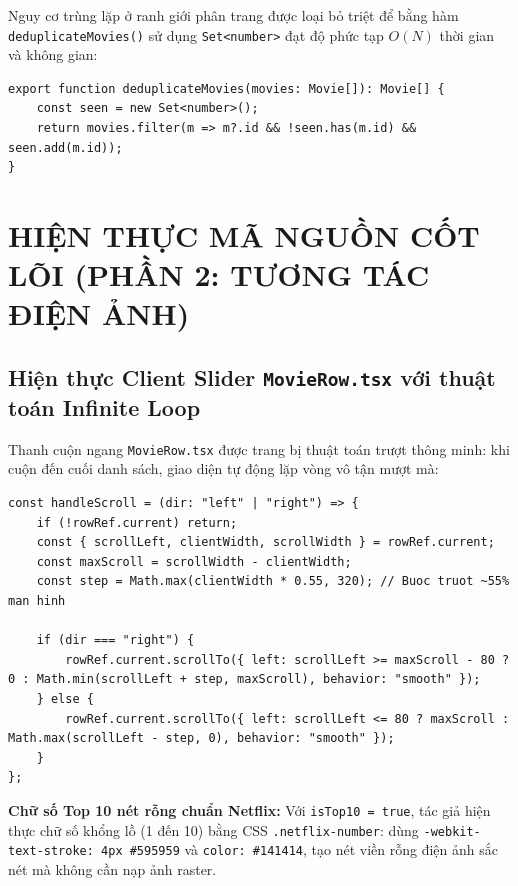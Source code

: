 \documentclass[12pt,a4paper]{extarticle}
\begin{document}
\noindent Nguy cơ trùng lặp ở ranh giới phân trang được loại bỏ triệt để bằng hàm \texttt{deduplicateMovies()} sử dụng \texttt{Set<number>} đạt độ phức tạp $O(N)$ thời gian và không gian:

\begin{lstlisting}[caption={Thuật toán loại bỏ phần tử trùng lặp theo ID}]
export function deduplicateMovies(movies: Movie[]): Movie[] {
    const seen = new Set<number>();
    return movies.filter(m => m?.id && !seen.has(m.id) && seen.add(m.id));
}
\end{lstlisting}

\section{HIỆN THỰC MÃ NGUỒN CỐT LÕI (PHẦN 2: TƯƠNG TÁC ĐIỆN ẢNH)}

\subsection{Hiện thực Client Slider \texttt{MovieRow.tsx} với thuật toán Infinite Loop}
Thanh cuộn ngang \texttt{MovieRow.tsx} được trang bị thuật toán trượt thông minh: khi cuộn đến cuối danh sách, giao diện tự động lặp vòng vô tận mượt mà:

\begin{lstlisting}[caption={Thuật toán cuộn vô tận trong MovieRow.tsx}]
const handleScroll = (dir: "left" | "right") => {
    if (!rowRef.current) return;
    const { scrollLeft, clientWidth, scrollWidth } = rowRef.current;
    const maxScroll = scrollWidth - clientWidth;
    const step = Math.max(clientWidth * 0.55, 320); // Buoc truot ~55% man hinh

    if (dir === "right") {
        rowRef.current.scrollTo({ left: scrollLeft >= maxScroll - 80 ? 0 : Math.min(scrollLeft + step, maxScroll), behavior: "smooth" });
    } else {
        rowRef.current.scrollTo({ left: scrollLeft <= 80 ? maxScroll : Math.max(scrollLeft - step, 0), behavior: "smooth" });
    }
};
\end{lstlisting}

\noindent \textbf{Chữ số Top 10 nét rỗng chuẩn Netflix:} Với \texttt{isTop10 = true}, tác giả hiện thực chữ số khổng lồ (1 đến 10) bằng CSS \texttt{.netflix-number}: dùng \texttt{-webkit-text-stroke: 4px \#595959} và \texttt{color: \#141414}, tạo nét viền rỗng điện ảnh sắc nét mà không cần nạp ảnh raster.
\end{document}
